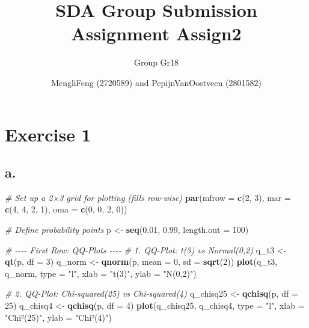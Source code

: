 \documentclass[
]{article}
\title{SDA Group Submission Assignment Assign2}
\subtitle{Group Gr18}
\author{MengliFeng (2720589) and PepijnVanOostveen (2801582)}
\date{}
\newenvironment{Shaded}{\begin{snugshade}}{\end{snugshade}}
\newcommand{\AttributeTok}[1]{\textcolor[rgb]{0.13,0.29,0.53}{#1}}
\newcommand{\CommentTok}[1]{\textcolor[rgb]{0.56,0.35,0.01}{\textit{#1}}}
\newcommand{\DecValTok}[1]{\textcolor[rgb]{0.00,0.00,0.81}{#1}}
\newcommand{\FloatTok}[1]{\textcolor[rgb]{0.00,0.00,0.81}{#1}}
\newcommand{\FunctionTok}[1]{\textcolor[rgb]{0.13,0.29,0.53}{\textbf{#1}}}
\newcommand{\NormalTok}[1]{#1}
\newcommand{\OtherTok}[1]{\textcolor[rgb]{0.56,0.35,0.01}{#1}}
\newcommand{\StringTok}[1]{\textcolor[rgb]{0.31,0.60,0.02}{#1}}
\begin{document}
\maketitle

\section{Exercise 1}\label{exercise-1}

\subsection{a.}\label{a.}

\begin{Shaded}
\begin{Highlighting}[]
\CommentTok{\# Set up a 2×3 grid for plotting (fills row{-}wise)}
\FunctionTok{par}\NormalTok{(}\AttributeTok{mfrow =} \FunctionTok{c}\NormalTok{(}\DecValTok{2}\NormalTok{, }\DecValTok{3}\NormalTok{), }\AttributeTok{mar =} \FunctionTok{c}\NormalTok{(}\DecValTok{4}\NormalTok{, }\DecValTok{4}\NormalTok{, }\DecValTok{2}\NormalTok{, }\DecValTok{1}\NormalTok{), }\AttributeTok{oma =} \FunctionTok{c}\NormalTok{(}\DecValTok{0}\NormalTok{, }\DecValTok{0}\NormalTok{, }\DecValTok{2}\NormalTok{, }\DecValTok{0}\NormalTok{))}

\CommentTok{\# Define probability points}
\NormalTok{p }\OtherTok{\textless{}{-}} \FunctionTok{seq}\NormalTok{(}\FloatTok{0.01}\NormalTok{, }\FloatTok{0.99}\NormalTok{, }\AttributeTok{length.out =} \DecValTok{100}\NormalTok{)}

\CommentTok{\# {-}{-}{-}{-} First Row: QQ{-}Plots {-}{-}{-}{-}}
\CommentTok{\# 1. QQ{-}Plot: t(3) vs Normal(0,2)}
\NormalTok{q\_t3 }\OtherTok{\textless{}{-}} \FunctionTok{qt}\NormalTok{(p, }\AttributeTok{df =} \DecValTok{3}\NormalTok{)}
\NormalTok{q\_norm }\OtherTok{\textless{}{-}} \FunctionTok{qnorm}\NormalTok{(p, }\AttributeTok{mean =} \DecValTok{0}\NormalTok{, }\AttributeTok{sd =} \FunctionTok{sqrt}\NormalTok{(}\DecValTok{2}\NormalTok{))}
\FunctionTok{plot}\NormalTok{(q\_t3, q\_norm, }\AttributeTok{type =} \StringTok{"l"}\NormalTok{, }\AttributeTok{xlab =} \StringTok{"t(3)"}\NormalTok{, }\AttributeTok{ylab =} \StringTok{"N(0,2)"}\NormalTok{)}

\CommentTok{\# 2. QQ{-}Plot: Chi{-}squared(25) vs Chi{-}squared(4)}
\NormalTok{q\_chisq25 }\OtherTok{\textless{}{-}} \FunctionTok{qchisq}\NormalTok{(p, }\AttributeTok{df =} \DecValTok{25}\NormalTok{)}
\NormalTok{q\_chisq4 }\OtherTok{\textless{}{-}} \FunctionTok{qchisq}\NormalTok{(p, }\AttributeTok{df =} \DecValTok{4}\NormalTok{)}
\FunctionTok{plot}\NormalTok{(q\_chisq25, q\_chisq4, }\AttributeTok{type =} \StringTok{"l"}\NormalTok{, }\AttributeTok{xlab =} \StringTok{"Chi²(25)"}\NormalTok{, }\AttributeTok{ylab =} \StringTok{"Chi²(4)"}\NormalTok{)}


\end{Highlighting}
\end{Shaded}
\end{document}
